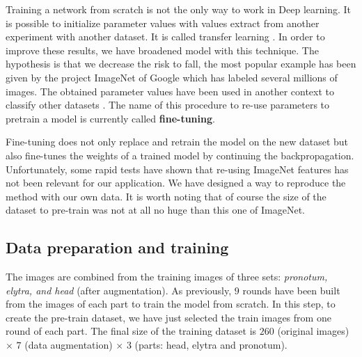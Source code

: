 \documentclass[review]{elsarticle}
\begin{document}
Training a network from scratch is not the only way to work in Deep learning. It is possible to initialize parameter values with values extract from another experiment with another dataset. It is called transfer learning \cite{torrey2009transfer}. In order to improve these results, we have broadened model with this technique. The hypothesis is that we decrease the risk to fall, the most popular example has been given by the project ImageNet of Google \cite{imagenet_cvpr09} which has labeled several millions of images. The obtained parameter values have been used in another context to classify other datasets \cite{margeta_mri}. The name of this procedure to re-use parameters to pretrain a model is currently called \textbf{fine-tuning}.

Fine-tuning does not only replace and retrain the model on
the new dataset but also fine-tunes the weights of a trained
model by continuing the backpropagation. Unfortunately,
some rapid tests have shown that re-using ImageNet features
has not been relevant for our application. We have designed a
way to reproduce the method with our own data. It is worth
noting that of course the size of the dataset to pre-train was not at all no huge than this one of ImageNet. 
\subsection{Data preparation and training}
The images are combined from the training images of three sets: \textit{pronotum, elytra, and head} (after augmentation). As previously, $9$ rounds have been built from the images of each part to train the model from scratch. In this step, to create the pre-train dataset, we have just selected the train images from one round of each part. The final size of the training dataset is $260$ (original images) $\times$ $7$ (data augmentation) $\times$ 3 (parts: head, elytra and pronotum).

\end{document}
